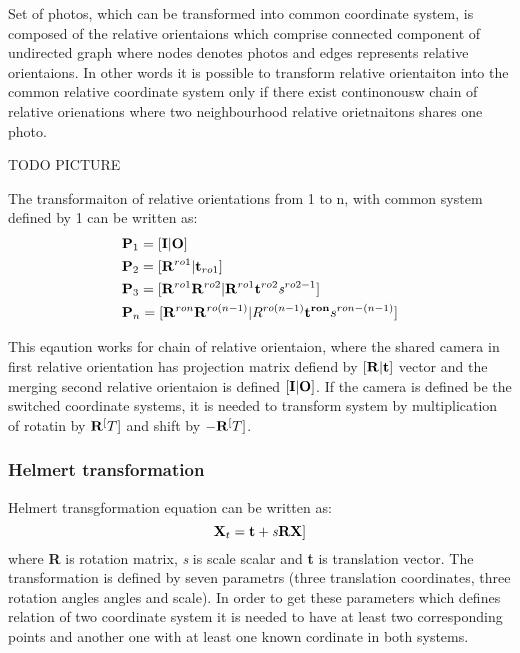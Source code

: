 \documentclass[a4paper,12pt]{report}
\newcommand{\ematr}[1]{
{\bf #1}
}
\newcommand{\evect}[1]{
{\bf #1}
}
\newcommand{\escal}[1]{
{\it #1}
}
\begin{document}
\begin{itemize}
Set of photos, which can be transformed into common coordinate system, is composed of the relative orientaions
which comprise connected component of undirected graph where nodes denotes photos and edges represents relative orientaions. 
In other words it is possible to transform relative orientaiton into the common relative coordinate system only if there 
exist continonousw chain of relative orienations where two neighbourhood relative orietnaitons shares one photo.

TODO PICTURE

The transformaiton of relative orientations from 1 to n, with common system defined by 1 can be written as: 
\begin{equation}
\begin{split}
&\ematr{P}_{1} = [\ematr{I}|\evect{O}] \\
&\ematr{P}_{2} = [\ematr{R}^{ro1}|\evect{t}_{ro1}] \\
&\ematr{P}_{3} = [\ematr{R}^{ro1} \ematr{R}^{ro2}| \ematr{R}^{ro1} \evect{t}^{ro2} \escal{s}^{ro2-1}] \\
&\ematr{P}_{n} = [\ematr{R}^{ron} \ematr{R}^{ro(n - 1)}| R^{ro(n - 1)} \evect{t^{ron}} {s}^{ron- (n-1)}] \\
\end{split}
\end{equation}


This eqaution works for chain of relative orientaion, where the shared camera in first relative orientation has 
projection matrix defiend by $[\ematr{R}|\evect{t}]$ vector and the merging second relative orientaion is 
defined $[\ematr{I}|\ematr{O}]$. If the camera is defined be the switched coordinate systems, it is needed to 
transform system by multiplication of rotatin by $\ematr{R}^[T]$ and shift by $-\ematr{R}^[T]$.

\subsubsection{Helmert transformation}
\label{sec:helmert}

Helmert transgformation equation can be written as:
\begin{equation}
\ematr{X}_{t} = \evect{t} + \escal{s}\ematr{R}\evect{X}] \\
\end{equation}
where \ematr{R} is rotation matrix, \escal{s} is scale scalar and  \evect{t} is translation vector.
The transformation is defined by seven parametrs (three translation coordinates, three rotation angles angles and scale).
In order to get these parameters which defines relation of two coordinate system it is needed to have at least two corresponding points and  another one with 
at least one known cordinate in both systems. 




\end{itemize}
\end{document}
